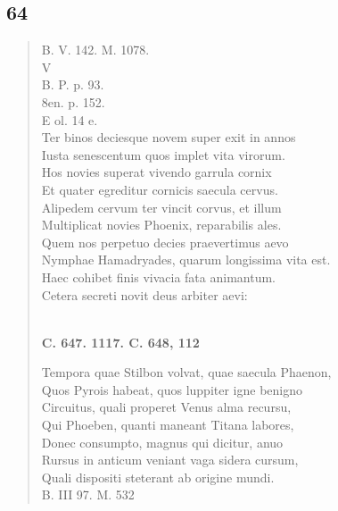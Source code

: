 \documentclass[11pt, a4paper]{report}
\begin{document}
            \subsection*{64}
      \begin{verse}
      B. V. 142. M. 1078. \\ V \\ B. P. p. 93. \\ 8en. p. 152. \\ E ol. 14 e. \\ Ter binos deciesque novem super exit in annos \\ Iusta senescentum quos implet vita virorum. \\ Hos novies superat vivendo garrula cornix \\ Et quater egreditur cornicis saecula cervus. \\ Alipedem cervum ter vincit corvus, et illum \\ Multiplicat novies Phoenix, reparabilis ales. \\ Quem nos perpetuo decies praevertimus aevo \\ Nymphae Hamadryades, quarum longissima vita est. \\ Haec cohibet finis vivacia fata animantum. \\ Cetera secreti novit deus arbiter aevi: \\ 
        ﻿\pagebreak 
    \begin{center} \textbf{C. 647. 1117. C. 648, 112} \end{center} \marginpar{[116]} Tempora quae Stilbon volvat, quae saecula Phaenon, \\ Quos Pyrois habeat, quos luppiter igne benigno \\ Circuitus, quali properet Venus alma recursu, \\ Qui Phoeben, quanti maneant Titana labores, \\ Donec consumpto, magnus qui dicitur, anuo \\ Rursus in anticum veniant vaga sidera cursum, \\ Quali dispositi steterant ab origine mundi. \\ B. III 97. M. 532 \\ 
      \end{verse}
  
\end{document}
